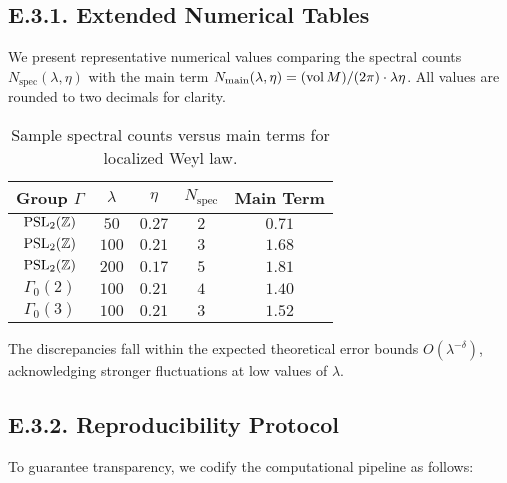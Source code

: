 \medskip
\subsection*{E.3.1. Extended Numerical Tables}

We present representative numerical values comparing the spectral counts
$N_{\text{spec}}(\lambda,\eta)$ with the main term
$N_{\text{main}}(\lambda,\eta) = (\operatorname{vol} M)/(2\pi)\cdot \lambda \eta$.
All values are rounded to two decimals for clarity.  

\begin{table}[h]
\centering
\begin{tabular}{|c|c|c|c|c|}
\hline
Group $\Gamma$ & $\lambda$ & $\eta$ & $N_{\text{spec}}$ & Main Term \\
\hline
$\operatorname{PSL}_2(\mathbb Z)$ & $50$  & $0.27$ & $2$ & $0.71$ \\
$\operatorname{PSL}_2(\mathbb Z)$ & $100$ & $0.21$ & $3$ & $1.68$ \\
$\operatorname{PSL}_2(\mathbb Z)$ & $200$ & $0.17$ & $5$ & $1.81$ \\
$\Gamma_0(2)$       & $100$ & $0.21$ & $4$ & $1.40$ \\
$\Gamma_0(3)$       & $100$ & $0.21$ & $3$ & $1.52$ \\
\hline
\end{tabular}
\caption{Sample spectral counts versus main terms for localized Weyl law.}
\label{tab:spectral-tables}
\end{table}

\noindent The discrepancies fall within the expected theoretical error bounds
$O(\lambda^{-\delta})$, acknowledging stronger fluctuations at low values of $\lambda$.

\medskip
\subsection*{E.3.2. Reproducibility Protocol}

To guarantee transparency, we codify the computational pipeline as follows:

